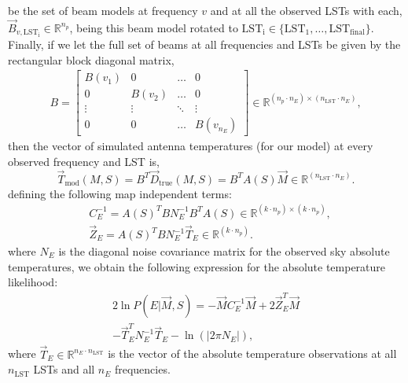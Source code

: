\documentclass[fleqn,usenatbib]{mnras}
\begin{document}
be the set of beam models at frequency $v$ and at all the observed LSTs with each, $\Vec{B}_{v,\mathrm{LST_i}}\in\mathbb{R}^{n_p}$, being this beam model rotated to $\mathrm{LST_i} \in \{\mathrm{LST_1},\ldots,\mathrm{LST_{final}}\}$. Finally, if we let the full set of beams at all frequencies and LSTs be given by the rectangular block diagonal matrix,
\begin{align}
    B = \begin{bmatrix} B(v_1) & 0 & \ldots & 0 \\ 0 & B(v_2) &\ldots & 0 \\ \vdots &\vdots &\ddots &\vdots \\ 0 & 0 &\ldots &B(v_{n_E}) \end{bmatrix} \in \mathbb{R} ^ {(n_p \cdot n_E) \times (n_\mathrm{LST} \cdot n_E)},
\end{align}
then the vector of simulated antenna temperatures (for our model) at every observed frequency and LST is,
\begin{equation}
    \Vec{T}_{\mathrm{mod}}(M,S) = B^T \Vec{D}_\mathrm{true}(M,S) = B^T A(S) \Vec{M} \in \mathbb{R} ^ {(n_\mathrm{LST} \cdot n_E)}.
\end{equation}
defining the following map independent terms:
\begin{equation}
\label{notation definition EDGES}
\begin{aligned}
    &C_E^{-1} = A(S)^T B N_E^{-1} B^T A(S) \in \mathbb{R}^{(k\cdot n_p)\times (k\cdot n_p)},\\
    &\Vec{Z}_E = A(S)^T B N_E^{-1} \Vec{T}_E \in \mathbb{R}^{(k\cdot n_p)}.
\end{aligned}
\end{equation}
where $N_E$ is the diagonal noise covariance matrix for the observed sky absolute temperatures, we obtain the following expression for the absolute temperature likelihood:
\begin{multline}\label{EDGES likelihood as a matrix expression}
    2\ln P\left(E|\Vec{M},S\right) = -\Vec{M} C_E^{-1}\Vec{M} + 2\Vec{Z}_E^T \Vec{M} \\- \Vec{T}_E^T N_E^{-1} \Vec{T}_E - \ln\left(\left|2\pi N_E\right|\right),
\end{multline}
where $\Vec{T}_E\in\mathbb{R}^{n_E\cdot n_\mathrm{LST}}$ is the vector of the absolute temperature observations at all $n_\mathrm{LST}$ LSTs and all $n_E$ frequencies.
\end{document}
